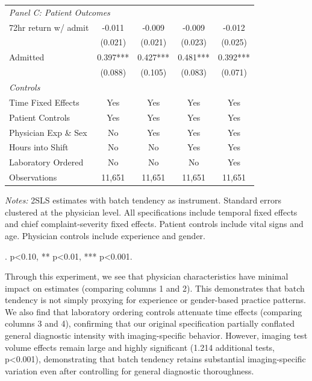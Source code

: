 \documentclass[11pt]{article}
\newcommand{\1}{\hbox{\rm 1\kern-.35em 1}}
\begin{document}
\begin{table}[H]
\begin{threeparttable}
\begin{tabular}{lcccc}
\multicolumn{4}{l}{\textit{Panel C: Patient Outcomes}} \\[0.5em]
72hr return w/ admit & -0.011 & -0.009 & -0.009  & -0.012 \\
& (0.021) & (0.021) & (0.023) & (0.025) \\[0.5em]
Admitted & 0.397*** & 0.427*** & 0.481***  & 0.392*** \\
& (0.088) & (0.105) & (0.083)  & (0.071) \\
\midrule
\textit{Controls} \\
Time Fixed Effects & Yes & Yes & Yes & Yes \\
Patient Controls & Yes & Yes & Yes & Yes \\
Physician Exp \& Sex & No & Yes & Yes & Yes \\
Hours into Shift & No & No & Yes & Yes \\
Laboratory Ordered & No & No & No & Yes \\
\midrule
Observations & 11,651 & 11,651 & 11,651 & 11,651 \\
\bottomrule
\end{tabular}
\begin{tablenotes}
\footnotesize
\item \textit{Notes:} 2SLS estimates with batch tendency as instrument. Standard errors clustered at the physician level. All specifications include temporal fixed effects and chief complaint-severity fixed effects. Patient controls include vital signs and age. Physician controls include experience and gender. 
\item . p<0.10, ** p<0.01, *** p<0.001.
\end{tablenotes}
\end{threeparttable}
\end{table}

Through this experiment, we see that physician characteristics have minimal impact on estimates (comparing columns 1 and 2). This demonstrates that batch tendency is not simply proxying for experience or gender-based practice patterns. We also find that laboratory ordering controls attenuate time effects (comparing columns 3 and 4), confirming that our original specification partially conflated general diagnostic intensity with imaging-specific behavior. However, imaging test volume effects remain large and highly significant (1.214 additional tests, p<0.001), demonstrating that batch tendency retains substantial imaging-specific variation even after controlling for general diagnostic thoroughness.
\end{document}
